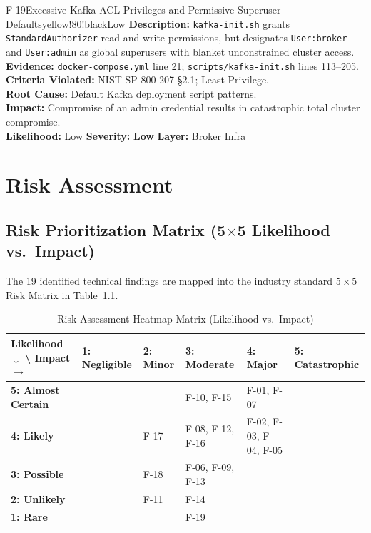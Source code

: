 \documentclass[10pt,a4paper]{report}
\begin{document}
\begin{findingbox}{F-19}{Excessive Kafka ACL Privileges and Permissive Superuser Defaults}{yellow!80!black}{Low}
\textbf{Description:} \texttt{kafka-init.sh} grants \texttt{StandardAuthorizer} read and write permissions, but designates \texttt{User:broker} and \texttt{User:admin} as global superusers with blanket unconstrained cluster access.\\
\textbf{Evidence:} \texttt{docker-compose.yml} line 21; \texttt{scripts/kafka-init.sh} lines 113--205.\\
\textbf{Criteria Violated:} NIST SP 800-207 §2.1; Least Privilege.\\
\textbf{Root Cause:} Default Kafka deployment script patterns.\\
\textbf{Impact:} Compromise of an admin credential results in catastrophic total cluster compromise.\\
\textbf{Likelihood:} Low \quad \textbar \quad \textbf{Severity:} \textbf{Low} \quad \textbar \quad \textbf{Layer:} Broker Infra
\end{findingbox}

\chapter{Risk Assessment}

\section{Risk Prioritization Matrix (5$\times$5 Likelihood vs.\ Impact)}
The 19 identified technical findings are mapped into the industry standard $5\times 5$ Risk Matrix in Table~\ref{tab:risk_heatmap}.

\begin{table}[htbp]
\centering
\small
\caption{Risk Assessment Heatmap Matrix (Likelihood vs.\ Impact)}
\label{tab:risk_heatmap}
\begin{tabularx}{\textwidth}{|l|X|X|X|X|X|}
\hline
\textbf{Likelihood $\downarrow$ \textbackslash{} Impact $\rightarrow$} & \textbf{1: Negligible} & \textbf{2: Minor} & \textbf{3: Moderate} & \textbf{4: Major} & \textbf{5: Catastrophic} \\
\hline
\textbf{5: Almost Certain} & & & \cellcolor{orange!30}F-10, F-15 & \cellcolor{red!40}F-01, F-07 & \\
\hline
\textbf{4: Likely} & & \cellcolor{yellow!30}F-17 & \cellcolor{orange!30}F-08, F-12, F-16 & \cellcolor{red!40}F-02, F-03, F-04, F-05 & \\
\hline
\textbf{3: Possible} & & \cellcolor{yellow!30}F-18 & \cellcolor{orange!30}F-06, F-09, F-13 & & \\
\hline
\textbf{2: Unlikely} & & \cellcolor{yellow!30}F-11 & \cellcolor{orange!30}F-14 & & \\
\hline
\textbf{1: Rare} & & & \cellcolor{yellow!30}F-19 & & \\
\hline
\end{tabularx}
\end{table}
\end{document}
